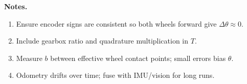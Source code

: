 \documentclass[12pt]{article}
\begin{document}
\textbf{Notes.}
\begin{enumerate}
  \item Ensure encoder signs are consistent so both wheels forward give $\Delta\theta\approx 0$.
  \item Include gearbox ratio and quadrature multiplication in $T$.
  \item Measure $b$ between effective wheel contact points; small errors bias $\theta$.
  \item Odometry drifts over time; fuse with IMU/vision for long runs.
\end{enumerate}
\end{document}
